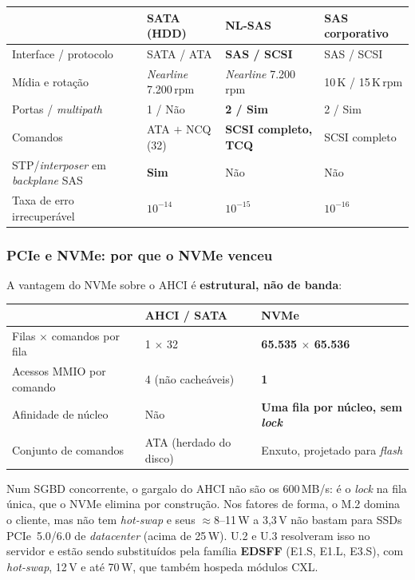 \documentclass[11pt,a4paper]{article}
\begin{document}
\begin{center}\small
\begin{tabular}{@{}p{3.9cm}p{3.3cm}p{3.4cm}p{3.3cm}@{}}
\toprule
 & \textbf{SATA (HDD)} & \textbf{NL-SAS} & \textbf{SAS corporativo} \\
\midrule
Interface / protocolo & SATA / ATA & \textbf{SAS / SCSI} & SAS / SCSI \\
Mídia e rotação & \emph{Nearline} 7.200\,rpm & \emph{Nearline} 7.200\,rpm & 10\,K / 15\,K\,rpm \\
Portas / \emph{multipath} & 1 / Não & \textbf{2 / Sim} & 2 / Sim \\
Comandos & ATA $+$ NCQ (32) & \textbf{SCSI completo, TCQ} & SCSI completo \\
STP/\emph{interposer} em \emph{backplane} SAS & \textbf{Sim} & Não & Não \\
Taxa de erro irrecuperável & $10^{-14}$ & $10^{-15}$ & $10^{-16}$ \\
\bottomrule
\end{tabular}
\end{center}

\subsubsection*{PCIe e NVMe: por que o NVMe venceu}

A vantagem do NVMe sobre o AHCI é \textbf{estrutural, não de banda}:

\begin{center}\small
\begin{tabular}{@{}p{5.2cm}p{4.0cm}p{5.0cm}@{}}
\toprule
 & \textbf{AHCI / SATA} & \textbf{NVMe} \\
\midrule
Filas $\times$ comandos por fila & 1 $\times$ 32 & \textbf{65.535 $\times$ 65.536} \\
Acessos MMIO por comando & 4 (não cacheáveis) & \textbf{1} \\
Afinidade de núcleo & Não & \textbf{Uma fila por núcleo, sem \emph{lock}} \\
Conjunto de comandos & ATA (herdado do disco) & Enxuto, projetado para \emph{flash} \\
\bottomrule
\end{tabular}
\end{center}

Num SGBD concorrente, o gargalo do AHCI não são os 600\,MB/s: é o \emph{lock} na fila única,
que o NVMe elimina por construção. Nos fatores de forma, o M.2 domina o cliente, mas não tem
\emph{hot-swap} e seus $\approx$8--11\,W a 3,3\,V não bastam para SSDs PCIe~5.0/6.0 de
\emph{datacenter} (acima de 25\,W). U.2 e U.3 resolveram isso no servidor e estão sendo
substituídos pela família \textbf{EDSFF} (E1.S, E1.L, E3.S), com \emph{hot-swap}, 12\,V e até
70\,W, que também hospeda módulos CXL.
\end{document}

